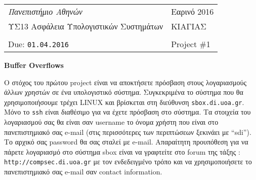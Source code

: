 \documentclass[11pt,a4paper]{article}
\begin{document}
\begin{tabular}{|p{10cm}p{4cm}|}
\hline
{\em Πανεπιστήμιο Αθηνών} & \hfill Εαρινό 2016 \\
ΥΣ13 Ασφάλεια Υπολογιστικών Συστημάτων & \hfill ΚΙΑΓΙΑΣ \\
& \\
Due: {\tt 01.04.2016} &  \hfill  Project \#1 \\
\hline
\end{tabular}
\vspace{0.5cm}


{\bf Buffer Overflows}

\medskip

Ο στόχος του πρώτου project είναι να αποκτήσετε 
πρόσβαση στους λογαριασμούς άλλων χρηστών σε ένα υπολογιστικό
σύστημα. Συγκεκριμένα το σύστημα που θα χρησιμοποιήσουμε
τρέχει LINUX και βρίσκεται στη διεύθυνση 
{\tt sbox.di.uoa.gr}. Μόνο το  {\tt ssh} είναι διαθέσιμο
για να έχετε πρόσβαση στο σύστημα. Τα στοιχεία του λογαριασμού
σας θα είναι σαν username το όνομα χρήστη που είναι στο πανεπιστημιακό
σας e-mail (στις περισσότερες των περιπτώσεων ξεκινάει με ``sdi'').
Το αρχικό σας password θα σας σταλεί με e-mail. Απαραίτητη προυπόθεση για να πάρετε λογαριασμό στο σύστημα sbox είναι να γραφτείτε στο forum 
της τάξης : {\tt http://compsec.di.uoa.gr} με τον ενδεδειγμένο τρόπο
και να χρησιμοποιήσετε το πανεπιστημιακό σας e-mail σαν contact information. 
\end{document}
